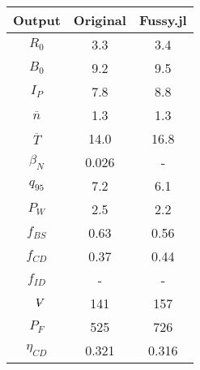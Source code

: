 \begin{table}[h!]
\begin{subtable}[t]{0.5\textwidth}
\begin{tabular}{ c|c|c }
Output           & Original         & Fussy.jl        \\
\hline
$R_{0}$          & 3.3              & 3.4           \\
$B_{0}$          & 9.2              & 9.5           \\
$I_{P}$          & 7.8              & 8.8           \\
$\overline n$    & 1.3              & 1.3           \\
$\overline T$    & 14.0             & 16.8           \\
$\beta_{N}$       & 0.026           & -          \\
$q_{95}$         & 7.2              & 6.1           \\
$P_{W}$          & 2.5              & 2.2           \\
$f_{BS}$         & 0.63             & 0.56          \\
$f_{CD}$         & 0.37             & 0.44          \\
$f_{ID}$         & -              & -             \\
$\volume$         & 141            & 157           \\
$P_{F}$          & 525            & 726           \\
$\eta_{CD}$      & 0.321            & 0.316          \\

\end{tabular}
\end{subtable}
\hfill
\hfill
\label{table:arc}
\end{table}

\clearpage

\newpage

